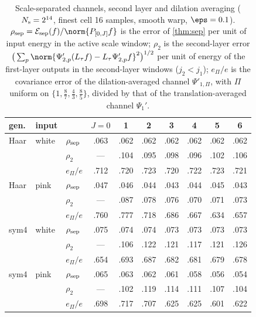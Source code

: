 \begin{table}[t]\centering\small
\begin{tabular}{lll ccccccc}\toprule
gen. & input & & $J=0$ & 1 & 2 & 3 & 4 & 5 & 6\\\midrule
Haar & white & $\rho_{\rm sep}$ & .063 & .062 & .062 & .062 & .062 & .062 & .062\\
 &  & $\rho_2$ & --- & .104 & .095 & .098 & .096 & .102 & .106\\
 &  & $e_\Pi/e$ & .712 & .720 & .723 & .720 & .722 & .723 & .721\\
Haar & pink & $\rho_{\rm sep}$ & .047 & .046 & .044 & .043 & .044 & .045 & .043\\
 &  & $\rho_2$ & --- & .087 & .078 & .076 & .070 & .071 & .073\\
 &  & $e_\Pi/e$ & .760 & .777 & .718 & .686 & .667 & .634 & .657\\\midrule
sym4 & white & $\rho_{\rm sep}$ & .075 & .074 & .074 & .073 & .073 & .073 & .073\\
 &  & $\rho_2$ & --- & .106 & .122 & .121 & .117 & .121 & .126\\
 &  & $e_\Pi/e$ & .654 & .693 & .687 & .682 & .681 & .679 & .678\\
sym4 & pink & $\rho_{\rm sep}$ & .065 & .063 & .062 & .061 & .058 & .056 & .054\\
 &  & $\rho_2$ & --- & .102 & .119 & .114 & .111 & .107 & .104\\
 &  & $e_\Pi/e$ & .698 & .717 & .707 & .625 & .625 & .601 & .622\\\bottomrule
\end{tabular}
\caption{Scale-separated channels, second layer and dilation averaging ($N_{\rm s}=2^{14}$, finest cell 16 samples, smooth warp, $\eps=0.1$). $\rho_{\rm sep}=\mathcal E_{\rm sep}(f)/\norm{P_{[0,J]}f}$ is the error of \cref{thm:sep} per unit of input energy in the active scale window; $\rho_2$ is the second-layer error $\big(\sum_p\norm{\Psi'_{2,p}(L_\tau f)-L_\tau\Psi'_{2,p}f}^2\big)^{1/2}$ per unit of energy of the first-layer outputs in the second-layer windows ($j_2<j_1$); $e_\Pi/e$ is the covariance error of the dilation-averaged channel $\Psi'_{1,\Pi}$, with $\Pi$ uniform on $\{1,\frac87,\frac43,\frac85\}$, divided by that of the translation-averaged channel $\Psi_1'$.}\label{tab:ext}
\end{table}
